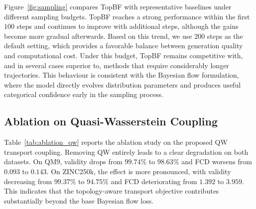 \documentclass[journal,twoside,web]{ieeecolor}
\begin{document}
Figure~\ref{fig:sampling} compares TopBF with representative baselines under different sampling budgets. TopBF reaches a strong performance within the first $100$ steps and continues to improve with additional steps, although the gains become more gradual afterwards. Based on this trend, we use $200$ steps as the default setting, which provides a favorable balance between generation quality and computational cost. Under this budget, TopBF remains competitive with, and in several cases superior to, methods that require considerably longer trajectories. This behaviour is consistent with the Bayesian flow formulation, where the model directly evolves distribution parameters and produces useful categorical confidence early in the sampling process.




\subsection{Ablation on Quasi-Wasserstein Coupling}
\label{sec:ablation_qw}


Table~\ref{tab:ablation_qw} reports the ablation study on the proposed QW transport coupling. Removing QW entirely leads to a clear degradation on both datasets. On QM9, validity drops from $99.74\%$ to $98.63\%$ and FCD worsens from $0.093$ to $0.143$. On ZINC250k, the effect is more pronounced, with validity decreasing from $99.37\%$ to $94.75\%$ and FCD deteriorating from $1.392$ to $3.959$. This indicates that the topology-aware transport objective contributes substantially beyond the base Bayesian flow loss.
\end{document}
